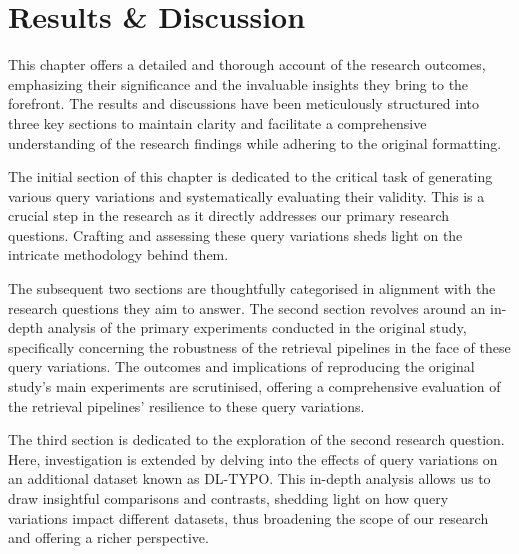 \chapter{Results \& Discussion}
This chapter offers a detailed and thorough account of the research outcomes, emphasizing their significance and the invaluable insights they bring to the forefront. The results and discussions have been meticulously structured into three key sections to maintain clarity and facilitate a comprehensive understanding of the research findings while adhering to the original formatting.

The initial section of this chapter is dedicated to the critical task of generating various query variations and systematically evaluating their validity. This is a crucial step in the research as it directly addresses our primary research questions. Crafting and assessing these query variations sheds light on the intricate methodology behind them.

The subsequent two sections are thoughtfully categorised in alignment with the research questions they aim to answer. The second section revolves around an in-depth analysis of the primary experiments conducted in the original study, specifically concerning the robustness of the retrieval pipelines in the face of these query variations. The outcomes and implications of reproducing the original study's main experiments are scrutinised, offering a comprehensive evaluation of the retrieval pipelines' resilience to these query variations.

The third section is dedicated to the exploration of the second research question. Here, investigation is extended by delving into the effects of query variations on an additional dataset known as DL-TYPO. This in-depth analysis allows us to draw insightful comparisons and contrasts, shedding light on how query variations impact different datasets, thus broadening the scope of our research and offering a richer perspective.




